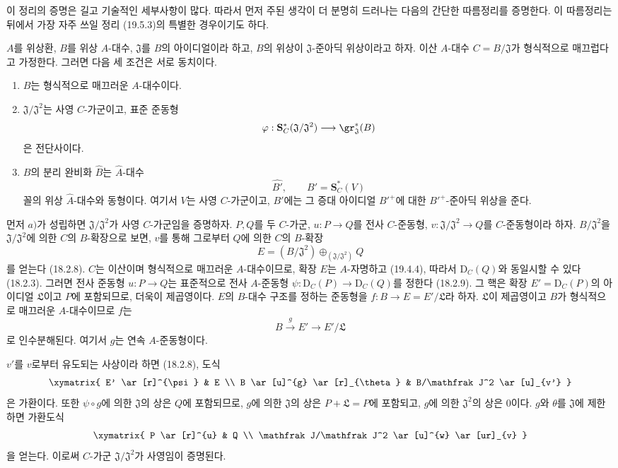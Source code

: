 이 정리의 증명은 길고 기술적인 세부사항이 많다. 따라서 먼저
주된 생각이 더 분명히 드러나는 다음의 간단한 따름정리를 증명한다.
이 따름정리는 뒤에서 가장 자주 쓰일 정리 (19.5.3)의 특별한
경우이기도 하다.

\begin{corollary}[19.5.4]
\label{0.19.5.4-fr}
$A$를 위상환, $B$를 위상 $A$-대수, $\mathfrak J$를 $B$의
아이디얼이라 하고, $B$의 위상이 $\mathfrak J$-준아딕 위상이라고
하자. 이산 $A$-대수 $C=B/\mathfrak J$가 형식적으로 매끄럽다고
가정한다. 그러면 다음 세 조건은 서로 동치이다.
\begin{enumerate}
  \item[a)] $B$는 형식적으로 매끄러운 $A$-대수이다.
  \item[b)] $\mathfrak J/\mathfrak J^2$는 사영 $C$-가군이고,
  표준 준동형
  \[
    \varphi:\mathbf S_C^*(\mathfrak J/\mathfrak J^2)
    \longrightarrow\gr_{\mathfrak J}^*(B)
  \]
  은 전단사이다.
  \item[c)] $B$의 분리 완비화 $\widehat B$는
  $\widehat A$-대수
  \[
    \widehat{B'},\qquad B'=\mathbf S_C^*(V)
  \]
  꼴의 위상 $\widehat A$-대수와 동형이다. 여기서 $V$는 사영
  $C$-가군이고, $B'$에는 그 증대 아이디얼 ${B'}^+$에 대한
  ${B'}^+$-준아딕 위상을 준다.
\end{enumerate}
\end{corollary}

\begin{env}[19.5.4.1]
\label{0.19.5.4.1-fr}
먼저 $a)$가 성립하면 $\mathfrak J/\mathfrak J^2$가 사영
$C$-가군임을 증명하자. $P,Q$를 두 $C$-가군,
$u:P\to Q$를 전사 $C$-준동형,
$v:\mathfrak J/\mathfrak J^2\to Q$를 $C$-준동형이라 하자.
$B/\mathfrak J^2$을 $\mathfrak J/\mathfrak J^2$에 의한 $C$의
$B$-확장으로 보면, $v$를 통해 그로부터 $Q$에 의한 $C$의
$B$-확장
\[
  E=(B/\mathfrak J^2)\oplus_{(\mathfrak J/\mathfrak J^2)}Q
\]
를 얻는다 (18.2.8). $C$는 이산이며 형식적으로 매끄러운
$A$-대수이므로, 확장 $E$는 $A$-자명하고 (19.4.4), 따라서
$\mathrm D_C(Q)$와 동일시할 수 있다 (18.2.3). 그러면 전사 준동형
$u:P\to Q$는 표준적으로 전사 $A$-준동형
$\psi:\mathrm D_C(P)\to\mathrm D_C(Q)$를 정한다 (18.2.9). 그 핵은
확장 $E'=\mathrm D_C(P)$의 아이디얼 $\mathfrak L$이고 $P$에
포함되므로, 더욱이 제곱영이다. $E$의 $B$-대수 구조를 정하는
준동형을 $f:B\to E=E'/\mathfrak L$라 하자. $\mathfrak L$이
제곱영이고 $B$가 형식적으로 매끄러운 $A$-대수이므로 $f$는
\[
  B\xrightarrow{g}E'\longrightarrow E'/\mathfrak L
\]
로 인수분해된다. 여기서 $g$는 연속 $A$-준동형이다.


$v'$를 $v$로부터 유도되는 사상이라 하면 (18.2.8), 도식
\[
  \xymatrix{
    E' \ar[r]^{\psi} & E \\
    B \ar[u]^{g} \ar[r]_{\theta} & B/\mathfrak J^2 \ar[u]_{v'}
  }
\]
은 가환이다. 또한 $\psi\circ g$에 의한 $\mathfrak J$의 상은
$Q$에 포함되므로, $g$에 의한 $\mathfrak J$의 상은
$P+\mathfrak L=P$에 포함되고, $g$에 의한 $\mathfrak J^2$의 상은
0이다. $g$와 $\theta$를 $\mathfrak J$에 제한하면 가환도식
\[
  \xymatrix{
    P \ar[r]^{u} & Q \\
    \mathfrak J/\mathfrak J^2 \ar[u]^{w} \ar[ur]_{v}
  }
\]
을 얻는다. 이로써 $C$-가군 $\mathfrak J/\mathfrak J^2$가
사영임이 증명된다.
\end{env}

